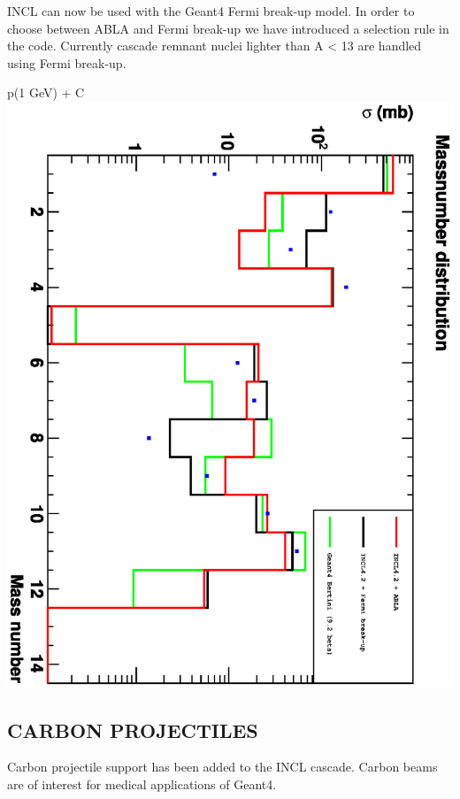 \documentclass[20pt]{article}
\newenvironment{textbox}
{\begin{lrbox}{\dummybox}\begin{minipage}{0.9\columnwidth}}
{\end{minipage}\end{lrbox}\raisebox{-\depth}{\psshadowbox[framesep=1em,framearc=.1,shadow=true]{\usebox{\dummybox}}}\vspace{0.005\textheight}}
\begin{document}
\begin{center}
\begin{multicols}{3}
\begin{textbox}
{{\sf INCL} can now be used with the {\sf Geant4} Fermi break-up
model. In order to choose between ABLA and Fermi break-up we have
introduced a selection rule in the code. Currently cascade remnant
nuclei lighter than A < 13 are handled using Fermi break-up.

\begin{center}
{\Huge {\sf p(1 GeV) + C}}
\includegraphics[scale=0.6,angle=90]{images/masses.eps}
\end{center}
}
\end{textbox}

\begin{textbox}
\section*{{\Huge {\sf CARBON PROJECTILES}}}
{\color{udsect}

Carbon projectile support has been added to the {\sf INCL}
cascade. Carbon beams are of interest for medical applications of {\sf
Geant4}.

}
\end{textbox}
\end{multicols}
\end{center}
\end{document}
